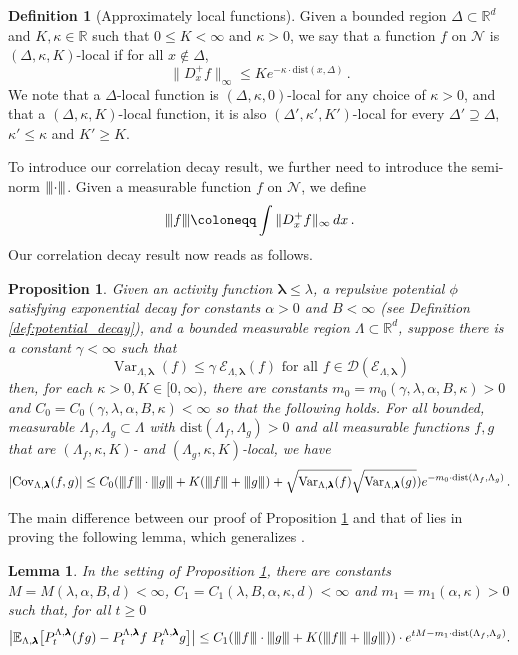 \documentclass[10pt]{amsart}
\newtheorem{lemma}[theorem]{Lemma}
\newtheorem{proposition}[theorem]{Proposition}
\theoremstyle{definition}
\newtheorem{definition}[theorem]{Definition}
\theoremstyle{remark}
\newcommand{\pointsets}{\mathcal{N}}
\newcommand{\dirichlet}{\mathcal{E}}
\newcommand{\tnorm}[1]{{\left\vert\kern-0.25ex\left\vert\kern-0.25ex\left\vert #1 
		\right\vert\kern-0.25ex\right\vert\kern-0.25ex\right\vert}}
\newcommand{\dist}{\mathrm{dist}}
\newcommand{\E}{\mathbb{E}}
\newcommand{\R}{\mathbb{R}}
\newcommand{\region}{\Lambda}
\newcommand{\potential}{\phi}
\newcommand{\activity}{\lambda}
\newcommand{\activities}{\pmb{\lambda}}
\newcommand{\domain}{\mathcal{D}}
\newcommand{\absolute}[1]{\left\lvert#1\right\rvert}
\newcommand{\Var}{{\operatorname{Var}}}
\newcommand{\Cov}{\operatorname{Cov}}
\begin{document}
	\begin{definition}[Approximately local functions]\label{def:approxlocal}
		Given a bounded region $\Delta \subset \R^d$ and $K, \kappa \in \mathbb{R}$ such that $0 \le K < \infty$ and $\kappa > 0$, we say that a function $f$ on $\pointsets$ is $(\Delta,\kappa, K)$-local if for all $x \notin \Delta$,
		\[
		\|D_x^+ f\|_\infty \leq K e^{- \kappa\cdot\dist(x,\Delta)}\,.
		\]
		We note that a $\Delta$-local function is $(\Delta,\kappa, 0)$-local for any choice of $\kappa > 0$, and that a $(\Delta,\kappa, K)$-local function, it is also $(\Delta',\kappa', K')$-local for every $\Delta' \supseteq \Delta$, $\kappa' \le \kappa$ and $K' \ge K$.
	\end{definition}
	To introduce our correlation decay result, we further need to introduce the semi-norm $\tnorm{\cdot}$.
	Given a measurable function $f$ on $\pointsets$, we define 
	\[
	\tnorm{ f } \coloneqq \int \|D_x^+ f\|_\infty \,dx\,.
	\]
	Our correlation decay result now reads as follows.
	\begin{proposition}\label{prop:covariance}
		Given an activity function $\activities \le \activity$, a repulsive potential $\potential$ satisfying exponential decay for constants $\alpha > 0$ and $B < \infty$ (see Definition \ref{def:potential_decay}), and a bounded measurable region $\region \subset \R^d$, suppose there is a constant $\gamma < \infty$ such that 
		\[
		\Var_{\region, \activities}(f) \leq \gamma \ \dirichlet_{\region, \activities}(f) \text{ for all } f \in \domain(\dirichlet_{\region, \activities})
		\]
		then, for each $\kappa > 0,  K \in [0,\infty)$, there are constants $m_0 = m_0(\gamma, \activity, \alpha, B, \kappa) > 0$ and $C_0 = C_0(\gamma, \activity, \alpha, B, \kappa) < \infty$ so that the following holds.  
		For all bounded, measurable $\region_f,\region_g \subset \region$ with $\dist(\region_f, \region_g) > 0$ and all measurable functions $f,g$ that are $(\region_f,\kappa, K)$- and $(\region_g,\kappa, K)$-local, we have 
		\[
		\absolute{\Cov_{\region, \activities}(f,g)} \leq C_0  (\tnorm{f} \cdot \tnorm{g} + K (\tnorm{f} + \tnorm{g}) + \sqrt{\Var_{\region,\activities}(f)} \sqrt{\Var_{\region,\activities}(g)})  e^{- m_0  \cdot\dist(\Lambda_f,\Lambda_g)}\,.
		\]
	\end{proposition}
	
	
	The main difference between our proof of Proposition \ref{prop:covariance} and that of \cite[Theorem 4.1]{bertini2002spectral} lies in proving the following lemma, which generalizes \cite[Lemma 4.2]{bertini2002spectral}.
	\begin{lemma} \label{lemma:unbounded_4.2}
		In the setting of Proposition \ref{prop:covariance}, there are constants $M = M(\activity, \alpha, B, d) < \infty$, $C_1 = C_1(\activity,B,\alpha,\kappa,d) < \infty$ and $m_1 = m_1(\alpha, \kappa) > 0$ such that, for all $t \ge 0$
		\[
		\big| \E_{\region, \activities}\big[P_t^{\region, \activities}(f g) - P_t^{\region, \activities}f \ 
		P_t^{\region, \activities}g\big]\big| \le C_1 (\tnorm{f} \cdot  \tnorm{g} + K  (\tnorm{f} + \tnorm{g})) \cdot e^{t  M - m_1  \cdot\dist(\region_f, \region_g)} .
		\]
	\end{lemma}
	
\end{document}
